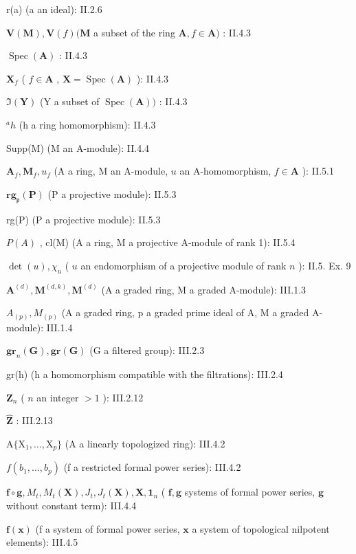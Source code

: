 r(a) (a an ideal): II.2.6

\(\mathbf{V}(\mathbf{M}), \mathbf{V}(f) (\mathbf{M}\) a subset of the ring \(\mathbf{A}, f \in \mathbf{A})\) : II.4.3

\(\operatorname {Spec}(\mathbf{A})\) : II.4.3

\(\mathbf{X}_f\) ( \(f \in \mathbf{A}\) , \(\mathbf{X} = \operatorname{Spec}(\mathbf{A})\) ): II.4.3

\(\Im (\mathbf{Y})\) (Y a subset of \(\operatorname {Spec}(\mathbf{A}))\) : II.4.3

\(^{a}h\) (h a ring homomorphism): II.4.3

Supp(M) (M an A-module): II.4.4

\(\mathbf{A}_f, \mathbf{M}_f, u_f\) (A a ring, M an A-module, \(u\) an A-homomorphism, \(f \in \mathbf{A}\) ): II.5.1

\(\mathbf{rg}_{\mathfrak{p}}(\mathbf{P})\) (P a projective module): II.5.3

rg(P) (P a projective module): II.5.3

\(P(A)\) , cl(M) (A a ring, M a projective A-module of rank 1): II.5.4

\(\operatorname{det}(u), \chi_u\) ( \(u\) an endomorphism of a projective module of rank \(n\) ): II.5. Ex. 9

\(\mathbf{A}^{(d)}, \mathbf{M}^{(d,k)}, \mathbf{M}^{(d)}\) (A a graded ring, M a graded A-module): III.1.3

\(A_{(p)}, M_{(p)}\) (A a graded ring, p a graded prime ideal of A, M a graded A-module): III.1.4

\(\mathbf{gr}_n(\mathbf{G}), \mathbf{gr}(\mathbf{G})\) (G a filtered group): III.2.3

gr(h) (h a homomorphism compatible with the filtrations): III.2.4

\(\mathbf{Z}_n\) ( \(n\) an integer \(>1\) ): III.2.12

\(\hat{\mathbf{Z}}\) : III.2.13

\(\mathrm{A}\{\mathrm{X}_1,\dots ,\mathrm{X}_p\}\) (A a linearly topologized ring): III.4.2

\(f(b_{1},\ldots ,b_{p})\) (f a restricted formal power series): III.4.2

\(\mathbf{f} \circ \mathbf{g}, M_{t}, M_{t}(\mathbf{X}), J_{t}, J_{t}(\mathbf{X}), \mathbf{X}, \mathbf{1}_{n}\) ( \(\mathbf{f}, \mathbf{g}\) systems of formal power series, \(\mathbf{g}\) without constant term): III.4.4

\(\mathbf{f}(\mathbf{x})\) (f a system of formal power series, \(\mathbf{x}\) a system of topological nilpotent elements): III.4.5

